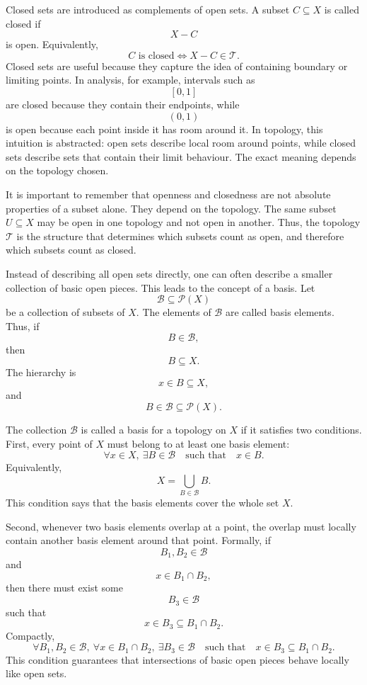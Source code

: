 \documentclass{article}
\begin{document}
	Closed sets are introduced as complements of open sets. A subset \(C\subseteq X\) is called closed if
	\[
	X-C
	\]
	is open. Equivalently,
	\[
	C\text{ is closed}
	\iff
	X-C\in\mathcal T.
	\]
	Closed sets are useful because they capture the idea of containing boundary or limiting points. In analysis, for example, intervals such as
	\[
	[0,1]
	\]
	are closed because they contain their endpoints, while
	\[
	(0,1)
	\]
	is open because each point inside it has room around it. In topology, this intuition is abstracted: open sets describe local room around points, while closed sets describe sets that contain their limit behaviour. The exact meaning depends on the topology chosen.
	
	It is important to remember that openness and closedness are not absolute properties of a subset alone. They depend on the topology. The same subset \(U\subseteq X\) may be open in one topology and not open in another. Thus, the topology \(\mathcal T\) is the structure that determines which subsets count as open, and therefore which subsets count as closed.
	
	Instead of describing all open sets directly, one can often describe a smaller collection of basic open pieces. This leads to the concept of a basis. Let
	\[
	\mathcal B\subseteq\mathcal P(X)
	\]
	be a collection of subsets of \(X\). The elements of \(\mathcal B\) are called basis elements. Thus, if
	\[
	B\in\mathcal B,
	\]
	then
	\[
	B\subseteq X.
	\]
	The hierarchy is
	\[
	x\in B\subseteq X,
	\]
	and
	\[
	B\in\mathcal B\subseteq\mathcal P(X).
	\]
	
	The collection \(\mathcal B\) is called a basis for a topology on \(X\) if it satisfies two conditions. First, every point of \(X\) must belong to at least one basis element:
	\[
	\forall x\in X,\ \exists B\in\mathcal B
	\quad\text{such that}\quad
	x\in B.
	\]
	Equivalently,
	\[
	X=\bigcup_{B\in\mathcal B}B.
	\]
	This condition says that the basis elements cover the whole set \(X\).
	
	Second, whenever two basis elements overlap at a point, the overlap must locally contain another basis element around that point. Formally, if
	\[
	B_1,B_2\in\mathcal B
	\]
	and
	\[
	x\in B_1\cap B_2,
	\]
	then there must exist some
	\[
	B_3\in\mathcal B
	\]
	such that
	\[
	x\in B_3\subseteq B_1\cap B_2.
	\]
	Compactly,
	\[
	\forall B_1,B_2\in\mathcal B,\ \forall x\in B_1\cap B_2,\ 
	\exists B_3\in\mathcal B
	\quad\text{such that}\quad
	x\in B_3\subseteq B_1\cap B_2.
	\]
	This condition guarantees that intersections of basic open pieces behave locally like open sets.
	
\end{document}
